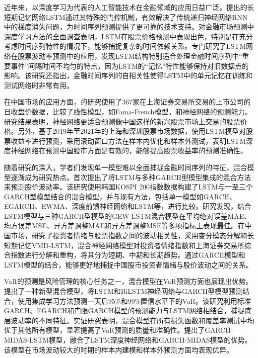 \documentclass[12pt, a4paper]{article}
\begin{document}
近年来，以深度学习为代表的人工智能技术在金融领域的应用日益广泛。\citet{hochreiter1997lstm}提出的长短期记忆网络LSTM通过其特殊的门控机制，有效解决了传统递归神经网络RNN中的梯度消失问题，为时间序列预测提供了更可靠的技术支持。\citet{yuan2020comprehensive}对金融市场预测中深度学习方法的全面调查表明，LSTM在股票价格预测中表现出色，特别是在充分考虑时间序列特性的情况下，能够捕捉复杂的时间依赖关系。\citet{sullivan2019stock}专门研究了LSTM网络在股票波动率预测中的应用，发现LSTM结构特别适合处理金融时间序列中“重要事件”间隔时间不均匀的特点，因为LSTM的“记忆”特性能够保持对旧数据点的影响。该研究还指出，金融时间序列的自相关性使得LSTM中的单元记忆在训练和测试网络时非常有用。

在中国市场的应用方面，\citet{cao2005nonlinear}的研究使用了367家在上海证券交易所交易的上市公司的日收盘价数据，比较了线性模型，如Fama-French模型，和神经网络的预测能力。研究结果表明，神经网络更适合预测像中国这样的新兴股票市场上交易的股票价格。另外，\citet{qiaoa2022prediction}基于2019年至2021年的上海和深圳股票市场数据，使用LSTM模型对股票收益率进行预测，采用滚动窗口方法在样本内优化和样本外测试，表明LSTM深度神经网络在预测中国股市方面是有效的，能够提高股票收益率的预测准确性。

随着研究的深入，学者们发现单一模型难以全面捕捉金融时间序列的特征，混合模型逐渐成为研究热点。\citet{kim2018forecasting}首次提出了将LSTM与多种GARCH型模型集成的混合方法来预测股价波动率。该研究使用韩国KOSPI 200指数数据构建了LSTM与一至三个GARCH型模型结合的混合模型，并与现有方法，包括单一模型如GARCH、EGARCH、EWMA、深度前馈神经网络和LSTM等，进行比较。研究发现，结合LSTM模型与三种GARCH型模型的GEW-LSTM混合模型在平均绝对误差MAE、均方误差MSE、异方差调整MAE和异方差调整MSE等多项指标上表现最佳。在中国市场，\citet{zhang2024vmd}研究了投资者情绪与股票指数之间的波动相关性，采用变分模态分解和长短期记忆VMD-LSTM，混合神经网络模型对投资者情绪指数和上海证券交易所综合指数进行分解和重构，将其分为短期、中期和长期趋势。通过GARCH模型和LSTM模型的结合，能够更好地捕捉中国股市投资者情绪与股价波动之间的关系。

VaR的预测是风险管理的核心任务之一，混合模型在VaR预测方面也展现出优势。\citet{kakade2022value}提出了一种新型混合模型，将LSTM和BiLSTM神经网络与GARCH型模型预测结合，使用集成学习方法预测一天后95\%和99\%置信水平下的VaR。该研究利用标准GARCH、EGARCH和门限GARCH模型的预测能力与LSTM网络相结合，捕捉底层波动率的不同特征。实证研究表明，混合模型在所有损失函数和覆盖率测试中均优于其他所有模型，显著提高了VaR预测的质量和准确性。\citet{firdous2023garch}提出了GARCH-MIDAS-LSTM模型，融合了LSTM深度神经网络和GARCH-MIDAS模型的优势。该模型在市场波动较大的时期的样本内建模和样本外预测方面均表现优异。
\end{document}
